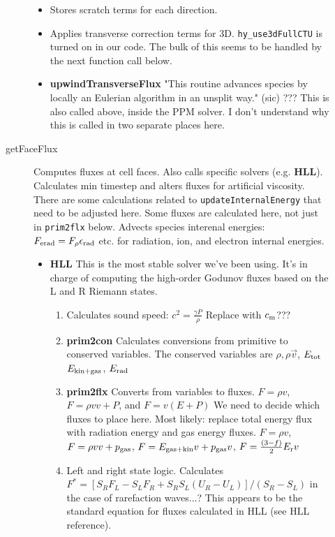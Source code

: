 \documentclass[preprint,11pt]{aastex}
\begin{document}
\begin{description}
\begin{description}
\begin{itemize}
			\item Stores scratch terms for each direction.
			\item Applies transverse correction terms for 3D.  \verb!hy_use3dFullCTU! is turned on in our code.  The bulk of this seems to be handled by the next function call below.
			\item \textbf{upwindTransverseFlux} "This routine advances species by locally an Eulerian algorithm in an unsplit way." (sic) ??? This is also called above, inside the PPM solver.  I don't understand why this is called in two separate places here.
		\end{itemize}
		\item[getFaceFlux] Computes fluxes at cell faces.  Also calls specific solvers (e.g. \textbf{HLL}).  Calculates min timestep and alters fluxes for artificial viscosity. {\color{blue} There are some calculations related to \verb!updateInternalEnergy! that need to be adjusted here.  Some fluxes are calculated here, not just in \verb!prim2flx! below.}  {\color{red} Advects species interenal energies: $F_{\rm erad} = F_{\rho} \epsilon_{\rm rad}$ etc. for radiation, ion, and electron internal energies.}
		\begin{itemize}
			\item \textbf{HLL} This is the most stable solver we've been using.  It's in charge of computing the high-order Godunov fluxes based on the L and R Riemann states.
			\begin{enumerate}
				\item Calculates sound speed: {\color{red} $c^2 = \frac{\gamma P}{\rho}$} {\color{blue} Replace with $c_{\rm m}$???}
				\item \textbf{prim2con} Calculates conversions from primitive to conserved variables.  The conserved variables are $\rho, \rho \vec{v}$, {\color{red}$E_{\rm tot}$} {\color{blue}$E_{\rm kin+gas}$, $E_{\rm rad}$} \\
				\item \textbf{prim2flx} Converts from variables to fluxes.  {\color{red} $F = \rho v$, $F=\rho v v + P$, and $F= v(E + P)$} {\color{blue} We need to decide which fluxes to place here.  Most likely: replace total energy flux with radiation energy and gas energy fluxes.  $F=\rho v$, $F=\rho v v + p_{\rm gas}$, $F=E_{
			\rm gas + kin} v + p_{\rm gas} v$, $F=\frac{(3-f)}{2}E_{\rm r} v$}
				\item Left and right state logic.  Calculates $F^* = \left[ S_R F_L - S_L F_R + S_R S_L (U_R - U_L) \right]/(S_R-S_L)$ in the case of rarefaction waves...?  This appears to be the standard equation for fluxes calculated in HLL (see HLL reference).

\end{enumerate}
\end{itemize}
\end{description}
\end{description}
\end{document}
